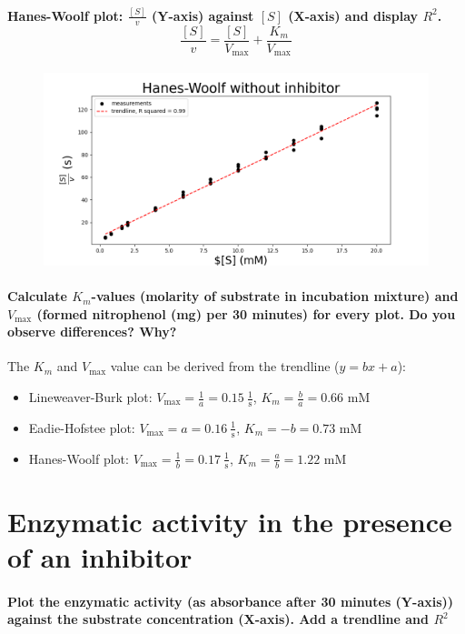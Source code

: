 \documentclass[a4paper,12pt]{article}
\begin{document}
\paragraph{Hanes-Woolf plot: $\frac{[S]}{v}$ (Y-axis) against $[S]$ (X-axis) and display $R^2$. \[\frac{[S]}{v}=\frac{[S]}{V_{\text{max}}}+\frac{K_m}{V_{\text{max}}}\]}

\begin{figure}[htb]
    \includegraphics[scale=0.4]{fig2_4.png}
    \centering
\end{figure}

\paragraph{Calculate $K_m$-values (molarity of substrate in incubation mixture) and $V_{\text{max}}$ (formed nitrophenol (mg) per 30 minutes) for every plot. Do you observe 
differences? Why?}

The $K_m$ and $V_{\text{max}}$ value can be derived from the trendline ($y = bx+a$):
\begin{itemize}
\item Lineweaver-Burk plot: $V_{\text{max}} = \frac{1}{a} = 0.15\: \frac{1}{\text{s}}$, $K_m = \frac{b}{a} = 0.66$ mM
\item Eadie-Hofstee plot: $V_{\text{max}} = a = 0.16\: \frac{1}{\text{s}}$, $K_m = -b = 0.73$ mM
\item Hanes-Woolf plot: $V_{\text{max}} = \frac{1}{b} = 0.17\: \frac{1}{\text{s}}$, $K_m = \frac{a}{b} = 1.22$ mM
\end{itemize}

\section{Enzymatic activity in the presence of an inhibitor}

\paragraph{Plot the enzymatic activity (as absorbance after 30 minutes (Y-axis)) 
against the substrate concentration (X-axis). Add a trendline and $R^2$}
\end{document}
